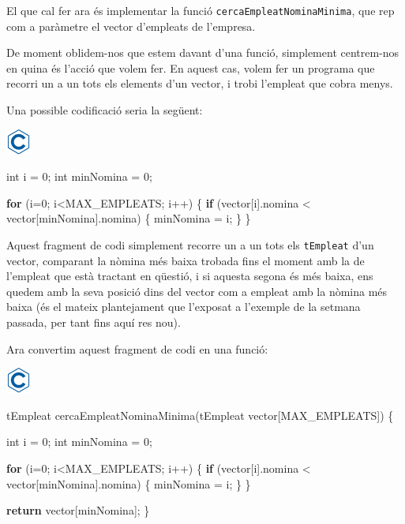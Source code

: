\documentclass[]{book}
\newenvironment{Shaded}{\begin{snugshade}}{\end{snugshade}}
\newcommand{\ControlFlowTok}[1]{\textcolor[rgb]{0.13,0.29,0.53}{\textbf{#1}}}
\newcommand{\DataTypeTok}[1]{\textcolor[rgb]{0.13,0.29,0.53}{#1}}
\newcommand{\DecValTok}[1]{\textcolor[rgb]{0.00,0.00,0.81}{#1}}
\newcommand{\NormalTok}[1]{#1}
\begin{document}
El que cal fer ara és implementar la funció \texttt{cercaEmpleatNominaMinima}, que rep com a paràmetre el vector d'empleats de l'empresa.

De moment oblidem-nos que estem davant d'una funció, simplement centrem-nos en quina és l'acció que volem fer. En aquest cas, volem fer un programa que recorri un a un tots els elements d'un vector, i trobi l'empleat que cobra menys.

Una possible codificació seria la següent:

\includegraphics{./img/c.png}

\begin{Shaded}
\begin{Highlighting}[]
\DataTypeTok{int}\NormalTok{ i = }\DecValTok{0}\NormalTok{; }
\DataTypeTok{int}\NormalTok{ minNomina = }\DecValTok{0}\NormalTok{;}

\ControlFlowTok{for}\NormalTok{ (i=}\DecValTok{0}\NormalTok{; i\textless{}MAX\_EMPLEATS; i++) \{}
    \ControlFlowTok{if}\NormalTok{ (vector[i].nomina \textless{} vector[minNomina].nomina) \{}
\NormalTok{        minNomina = i;}
\NormalTok{    \}}
\NormalTok{\}}
\end{Highlighting}
\end{Shaded}

Aquest fragment de codi simplement recorre un a un tots els \texttt{tEmpleat} d'un vector, comparant la nòmina més baixa trobada fins el moment amb la de l'empleat que està tractant en qüestió, i si aquesta segona és més baixa, ens quedem amb la seva posició dins del vector com a empleat amb la nòmina més baixa (és el mateix plantejament que l'exposat a l'exemple de la setmana passada, per tant fins aquí res nou).

Ara convertim aquest fragment de codi en una funció:

\includegraphics{./img/c.png}

\begin{Shaded}
\begin{Highlighting}[]
\NormalTok{tEmpleat cercaEmpleatNominaMinima(tEmpleat vector[MAX\_EMPLEATS]) \{}

    \DataTypeTok{int}\NormalTok{ i = }\DecValTok{0}\NormalTok{; }
    \DataTypeTok{int}\NormalTok{ minNomina = }\DecValTok{0}\NormalTok{;}

    \ControlFlowTok{for}\NormalTok{ (i=}\DecValTok{0}\NormalTok{; i\textless{}MAX\_EMPLEATS; i++) \{}
        \ControlFlowTok{if}\NormalTok{ (vector[i].nomina \textless{} vector[minNomina].nomina) \{}
\NormalTok{            minNomina = i;}
\NormalTok{        \}}
\NormalTok{    \}}

    \ControlFlowTok{return}\NormalTok{ vector[minNomina];}
\NormalTok{\}}
\end{Highlighting}
\end{Shaded}
\end{document}
